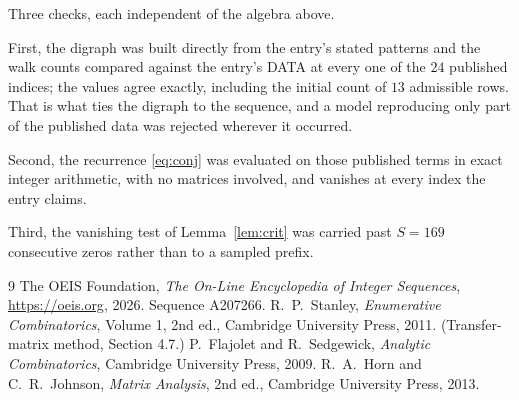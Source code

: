 \documentclass[11pt,a4paper]{article}
\theoremstyle{plain}
\theoremstyle{definition}
\begin{document}
Three checks, each independent of the algebra above.

First, the digraph was built directly from the entry's stated patterns and the walk counts
compared against the entry's DATA at every one of the $24$ published indices; the
values agree exactly, including the initial count of $13$ admissible rows. That is
what ties the digraph to the sequence, and a model reproducing only part of the published
data was rejected wherever it occurred.

Second, the recurrence \eqref{eq:conj} was evaluated on those published terms in exact
integer arithmetic, with no matrices involved, and vanishes at every index the entry claims.

Third, the vanishing test of Lemma~\ref{lem:crit} was carried past $S=169$ consecutive
zeros rather than to a sampled prefix.

\begin{thebibliography}{9}
 The OEIS Foundation, \emph{The On-Line Encyclopedia of Integer
Sequences}, \url{https://oeis.org}, 2026. Sequence A207266.
 R.~P.~Stanley, \emph{Enumerative Combinatorics}, Volume 1, 2nd ed.,
Cambridge University Press, 2011. (Transfer-matrix method, Section 4.7.)
 P.~Flajolet and R.~Sedgewick, \emph{Analytic Combinatorics}, Cambridge
University Press, 2009.
 R.~A.~Horn and C.~R.~Johnson, \emph{Matrix Analysis}, 2nd ed., Cambridge
University Press, 2013.
\end{thebibliography}
\end{document}
